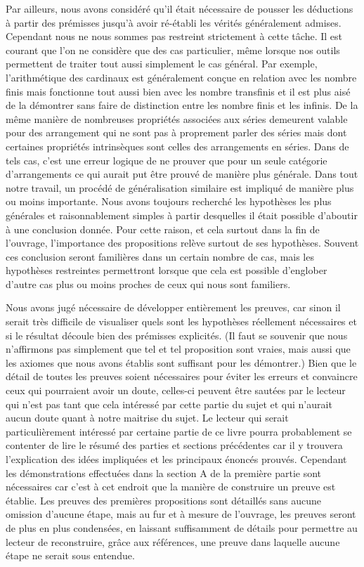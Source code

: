 \documentclass[a4paper]{book}
\begin{document}
Par ailleurs, nous avons considéré qu'il était nécessaire de pousser les déductions à partir des prémisses jusqu'à avoir ré-établi les vérités généralement admises. Cependant nous ne nous sommes pas restreint strictement à cette tâche. Il est courant que l'on ne considère que des cas particulier, même lorsque nos outils permettent de traiter tout aussi simplement le cas général. Par exemple, l'arithmétique des cardinaux est généralement conçue en relation avec les nombre finis mais fonctionne tout aussi bien avec les nombre transfinis et il est plus aisé de la démontrer sans faire de distinction entre les nombre finis et les infinis.  De la même manière de nombreuses propriétés associées aux séries demeurent valable pour des arrangement qui ne sont pas à proprement parler des séries mais dont certaines propriétés intrinsèques sont celles des arrangements en séries. Dans de tels cas, c'est une erreur logique de  ne prouver que pour un seule catégorie d'arrangements ce qui aurait put être prouvé de manière plus générale. Dans tout notre travail, un procédé de généralisation similaire est impliqué de manière plus ou moins importante. Nous avons toujours recherché les hypothèses les plus générales et raisonnablement simples à partir desquelles il était possible d'aboutir à une conclusion donnée. Pour cette raison, et cela surtout dans la fin de l'ouvrage, l'importance des propositions relève surtout de ses hypothèses. Souvent ces conclusion seront familières dans un certain nombre de cas, mais les hypothèses restreintes permettront lorsque que cela est possible d'englober d'autre cas plus ou moins proches de ceux qui nous sont familiers. 
 
Nous avons jugé nécessaire de développer entièrement les preuves, car sinon il serait très difficile de visualiser quels sont les hypothèses réellement nécessaires et si le résultat découle bien des prémisses explicités. (Il faut se souvenir que nous n'affirmons pas simplement que tel et tel proposition sont vraies, mais aussi que les axiomes que nous avons établis sont suffisant pour les démontrer.) Bien que le détail de toutes les preuves soient nécessaires pour éviter les erreurs et convaincre ceux qui pourraient avoir un doute, celles-ci peuvent être sautées par le lecteur qui n'est pas tant que cela intéressé par cette partie du sujet et qui n'aurait aucun doute quant à notre maitrise du sujet. Le lecteur qui serait particulièrement intéressé par certaine partie de ce livre pourra probablement se contenter de lire le résumé des parties et sections précédentes car il y trouvera l'explication des idées impliquées et les principaux énoncés prouvés. Cependant les démonstrations effectuées dans la section A de la première partie sont nécessaires car c'est à cet endroit que la manière de construire un preuve est établie. Les preuves des premières propositions sont détaillés sans aucune omission d'aucune étape, mais au fur et à mesure de l'ouvrage, les preuves seront de plus en plus condensées, en laissant suffisamment de détails pour permettre au lecteur de reconstruire, grâce aux références, une preuve dans laquelle aucune étape ne serait sous entendue.
 
\end{document}
